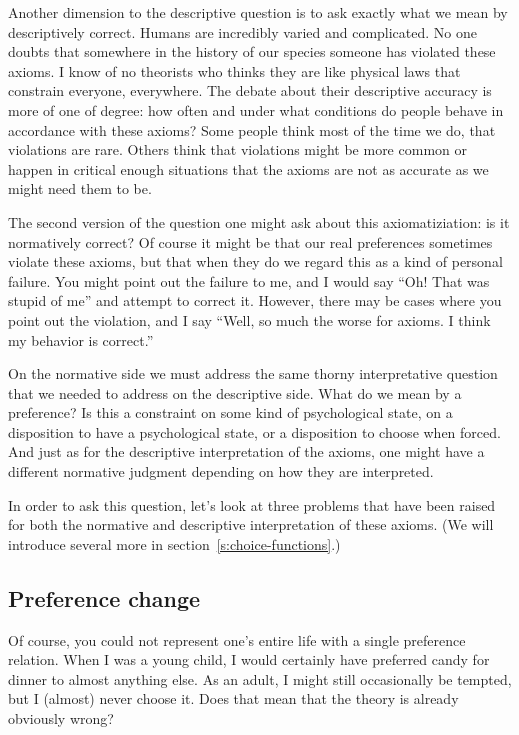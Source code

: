 Another dimension to the descriptive question is to ask exactly what we mean by descriptively correct.  Humans are incredibly varied and complicated. No one doubts that somewhere in the history of our species someone has violated these axioms.  I know of no theorists who thinks they are like physical laws that constrain everyone, everywhere.  The debate about their descriptive accuracy is more of one of degree: how often and under what conditions do people behave in accordance with these axioms?  Some people think most of the time we do, that violations are rare.  Others think that violations might be more common or happen in critical enough situations that the axioms are not as accurate as we might need them to be.

The second version of the question one might ask about this axiomatiziation: is it normatively correct? Of course it might be that our real preferences sometimes violate these axioms, but that when they do we regard this as a kind of personal failure.  You might point out the failure to me, and I would say ``Oh! That was stupid of me'' and attempt to correct it.  However, there may be cases where you point out the violation, and I say ``Well, so much the worse for axioms. I think my behavior is correct.''

On the normative side we must address the same thorny interpretative question that we needed to address on the descriptive side.  What do we mean by a preference?  Is this a constraint on some kind of psychological state, on a disposition to have a psychological state, or a disposition to choose when forced.  And just as for the descriptive interpretation of the axioms, one might have a different normative judgment depending on how they are interpreted.

In order to ask this question, let's look at three problems that have been raised for both the normative and descriptive interpretation of these axioms.  (We will introduce several more in section~\ref{s:choice-functions}.)

\subsection{Preference change}

Of course, you could not represent one's entire life with a single preference relation.  When I was a young child, I would certainly have preferred candy for dinner to almost anything else.  As an adult, I might still occasionally be tempted, but I (almost) never choose it.  Does that mean that the theory is already obviously wrong?

